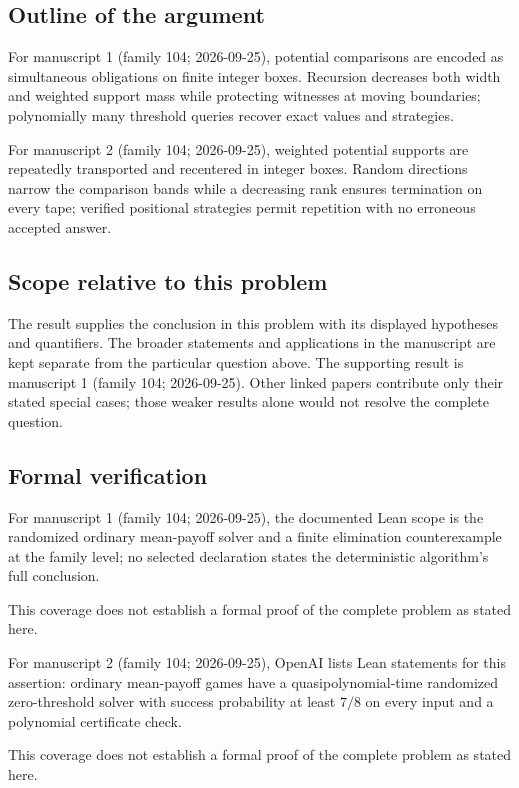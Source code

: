 \documentclass[11pt]{article}
\begin{document}
\subsection{Outline of the argument}
For manuscript 1 (family 104; 2026-09-25), potential comparisons are encoded as simultaneous obligations on finite integer boxes. Recursion decreases both width and weighted support mass while protecting witnesses at moving boundaries; polynomially many threshold queries recover exact values and strategies.

For manuscript 2 (family 104; 2026-09-25), weighted potential supports are repeatedly transported and recentered in integer boxes. Random directions narrow the comparison bands while a decreasing rank ensures termination on every tape; verified positional strategies permit repetition with no erroneous accepted answer.

\subsection{Scope relative to this problem}
The result supplies the conclusion in this problem with its displayed hypotheses and quantifiers. The broader statements and applications in the manuscript are kept separate from the particular question above. The supporting result is manuscript 1 (family 104; 2026-09-25). Other linked papers contribute only their stated special cases; those weaker results alone would not resolve the complete question.

\subsection{Formal verification}
For manuscript 1 (family 104; 2026-09-25), the documented Lean scope is the randomized ordinary mean-payoff solver and a finite elimination counterexample at the family level; no selected declaration states the deterministic algorithm's full conclusion.

This coverage does not establish a formal proof of the complete problem as stated here.

For manuscript 2 (family 104; 2026-09-25), OpenAI lists Lean statements for this assertion: ordinary mean-payoff games have a quasipolynomial-time randomized zero-threshold solver with success probability at least $7/8$ on every input and a polynomial certificate check.

This coverage does not establish a formal proof of the complete problem as stated here.
\end{document}
